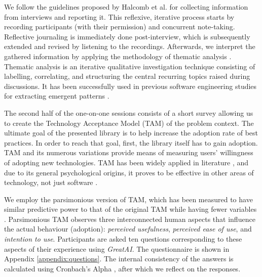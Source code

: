We follow the guidelines proposed by Halcomb et al. \cite{halcomb2006verbatim} for collecting information from interviews and reporting it. This reflexive, iterative process starts by recording participants (with their permission) and concurrent note-taking. Reflective journaling is immediately done post-interview, which is subsequently extended and revised by listening to the recordings. Afterwards, we interpret the gathered information by applying the methodology of thematic analysis \cite{alhojailan2012thematic}. Thematic analysis is an iterative qualitative investigation technique consisting of labelling, correlating, and structuring the central recurring topics raised during discussions. It has been successfully used in previous software engineering studies for extracting emergent patterns \cite{haakman2021ai,cruz2019catalog}. 

The second half of the one-on-one sessions consists of a short survey allowing us to create the Technology Acceptance Model (TAM) \cite{davis1989perceived} of the problem context. The ultimate goal of the presented library is to help increase the adoption rate of best practices. In order to reach that goal, first, the library itself has to gain adoption. TAM and its numerous variations provide means of measuring users' willingness of adopting new technologies. TAM has been widely applied in literature \cite{marangunic2015technology}, and due to its general psychological origins, it proves to be effective in other areas of technology, not just software \cite{riemenschneider2002explaining}. 

We employ the parsimonious version of TAM, which has been measured to have similar predictive power to that of the original TAM while having fewer variables \cite{wu2011user}. Parsimonious TAM observes three interconnected human aspects that influence the actual behaviour (adoption): \textit{perceived usefulness}, \textit{perceived ease of use}, and \textit{intention to use}. Participants are asked ten questions corresponding to these aspects of their experience using \textit{GreatAI}. The questionnaire is shown in Appendix \ref{appendix:questions}. The internal consistency of the answers is calculated using Cronbach's Alpha \cite{bland1997statistics}, after which we reflect on the responses.
